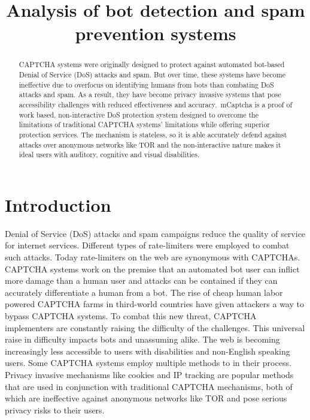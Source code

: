 \documentclass[conference]{IEEEtran}
\begin{document}
\title{Analysis of bot detection and spam prevention systems} 

\author{
}
\maketitle

\begin{abstract}
	CAPTCHA systems were originally designed to protect against automated
	bot-based Denial of Service (DoS) attacks and spam. But over time, these
	systems have become ineffective due to overfocus on identifying humans from
	bots than combating DoS attacks and spam. As a result, they have become
	privacy invasive systems that pose accessibility challenges with reduced
	effectiveness and accuracy.\ mCaptcha is a proof of work based,
	non-interactive DoS protection system designed to overcome the limitations
	of traditional CAPTCHA systems' limitations while offering superior
	protection services. The mechanism is stateless, so it is able accurately
	defend against attacks over anonymous networks like TOR and the
	non-interactive nature makes it ideal users with auditory, cognitive and
	visual disabilities.
\end{abstract}
 
\section{Introduction}\label{sec:intro}
Denial of Service (DoS) attacks and spam campaigns reduce the quality of service
for internet services. Different types of rate-limiters were employed to combat
such attacks. Today rate-limiters on the web are synonymous with CAPTCHAs.
CAPTCHA systems work on the premise that an automated bot user can inflict more
damage than a human user and attacks can be contained if they can accurately
differentiate a human from a bot. The rise of cheap human labor powered CAPTCHA
farms in third-world countries have given attackers a way to bypass CAPTCHA
systems. To combat this new threat, CAPTCHA implementers are constantly raising the
difficulty of the challenges. This universal raise in difficulty impacts bots
and unassuming alike. The web is becoming increasingly less accessible to users
with disabilities and non-English speaking users. Some CAPTCHA systems employ
multiple methods to in their process. Privacy invasive mechanisms like cookies
and IP tracking are popular methods that are used in conjunction with
traditional CAPTCHA mechanisms, both of which are ineffective against
anonymous networks like TOR and pose serious privacy risks to their users.
\end{document}
